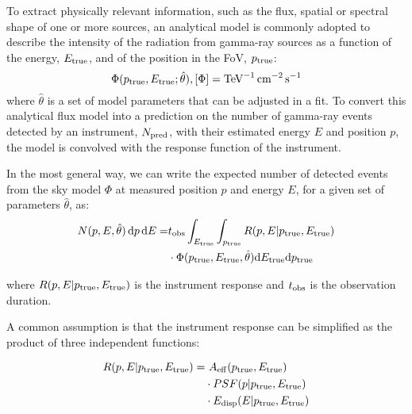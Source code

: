 \documentclass[longauth]{aa}
\begin{document}
To extract physically relevant information, such as the flux, spatial or spectral shape of one or more sources,
an analytical model is commonly adopted to describe the intensity of the radiation from gamma-ray sources
as a function of the energy, $E_{\rm true}$, and of the position in the FoV, $p_{\rm true}$:
\begin{equation}
    \Phi(p_{\rm true}, E_{\rm true}; \hat{\theta}), [\Phi] = \si{TeV^{-1}.cm^{-2}.s^{-1}}
    \label{eq:general_source_model}
\end{equation}
where $\hat{\theta}$ is a set of model parameters that can be adjusted in a fit. To convert this analytical flux model
into a prediction on the number of gamma-ray events detected by an instrument, $N_{\rm pred}$,
with their estimated energy $E$ and position $p$, the model is convolved with the response function of the instrument.


In the most general way, we can write the expected number of detected events from the sky model $\Phi$ at measured position $p$ and energy $E$, for
a given set of parameters $\hat{\theta}$, as:
%
\begin{equation}
	\begin{split}
   		N(p, E, \hat{\theta})\,{\rm d}p\,{\rm d}E = &t_{\rm obs} \int_{E_{\rm true}} \int_{p_{\rm true}}  R(p, E|p_{\rm true}, E_{\rm true}) \\
   		&\cdot \Phi(p_{\rm true}, E_{\rm true}, \hat{\theta} ) {\rm d}E_{\rm true} {\rm d}p_{\rm true}
	\end{split}
\end{equation}

where $R(p, E| p_{\rm true}, E_{\rm true})$ is the instrument response and $t_{\rm obs}$ is the observation duration.

A common assumption is that the instrument response can be simplified as the product
of three independent functions:

\begin{equation}
	\begin{split}
   R(p, E|p_{\rm true}, E_{\rm true}) = &~A_{\rm eff}(p_{\rm true}, E_{\rm true}) \\
	& \cdot PSF(p|p_{\rm true}, E_{\rm true})\\
    & \cdot E_{\rm disp}(E|p_{\rm true}, E_{\rm true})
	\end{split}
\end{equation}
\end{document}
